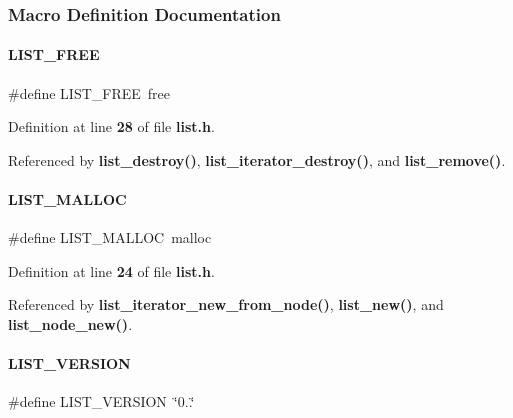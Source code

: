 \subsubsection{Macro Definition Documentation}
\mbox{\label{a00029_a8968cfdd1e3404352d2c43dcb3bde04a}} 
\paragraph{L\+I\+S\+T\+\_\+\+F\+R\+EE}
{\footnotesize\ttfamily \#define L\+I\+S\+T\+\_\+\+F\+R\+EE~free}



Definition at line \textbf{ 28} of file \textbf{ list.\+h}.



Referenced by \textbf{ list\+\_\+destroy()}, \textbf{ list\+\_\+iterator\+\_\+destroy()}, and \textbf{ list\+\_\+remove()}.

\mbox{\label{a00029_ab80cb68ecaaf76c970758cd702641cee}} 
\paragraph{L\+I\+S\+T\+\_\+\+M\+A\+L\+L\+OC}
{\footnotesize\ttfamily \#define L\+I\+S\+T\+\_\+\+M\+A\+L\+L\+OC~malloc}



Definition at line \textbf{ 24} of file \textbf{ list.\+h}.



Referenced by \textbf{ list\+\_\+iterator\+\_\+new\+\_\+from\+\_\+node()}, \textbf{ list\+\_\+new()}, and \textbf{ list\+\_\+node\+\_\+new()}.

\mbox{\label{a00029_a51882f8f16a119690e6d8a538f0e42ed}} 
\paragraph{L\+I\+S\+T\+\_\+\+V\+E\+R\+S\+I\+ON}
{\footnotesize\ttfamily \#define L\+I\+S\+T\+\_\+\+V\+E\+R\+S\+I\+ON~\char`\"{}0..\char`\"{}}



